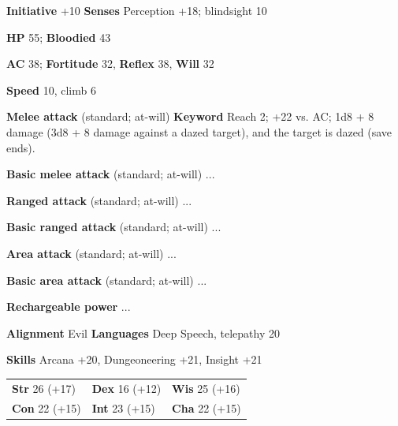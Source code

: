 \begin{monster}{}
	\textbf{Initiative} +10 \qquad \textbf{Senses} Perception +18; blindsight 10 \par
	\textbf{HP} 55; \textbf{Bloodied} 43 \par
	\textbf{AC} 38; \textbf{Fortitude} 32, \textbf{Reﬂex} 38, \textbf{Will} 32 \par
	\textbf{Speed} 10, climb 6 \par
	\begin{monsterskill}{\melee \textbf{Melee attack} (standard; at-will) \diam \textbf{Keyword}}
		Reach 2; +22 vs. AC; 1d8 + 8 damage (3d8 + 8 damage against a dazed target), and the target is dazed (save ends).
	\end{monsterskill}
	\begin{monsterskill}{\meleeBase \textbf{Basic melee attack} (standard; at-will)}
		...
	\end{monsterskill}
	\begin{monsterskill}{\ranged \textbf{Ranged attack} (standard; at-will)}
	...
	\end{monsterskill}
	\begin{monsterskill}{\rangedBase \textbf{Basic ranged attack} (standard; at-will)}
		...
	\end{monsterskill}
	\begin{monsterskill}{\area \textbf{Area attack} (standard; at-will)}
		...
	\end{monsterskill}
	\begin{monsterskill}{\areaBase \textbf{Basic area attack} (standard; at-will)}
		...
	\end{monsterskill}
	\begin{monsterskill}{\textbf{Rechargeable power} \done \dtwo \dthree \dfour \dfive \dsix}
		...
	\end{monsterskill}
	\begin{darkline}
		\textbf{Alignment} Evil \qquad \textbf{Languages} Deep Speech, telepathy 20


		\textbf{Skills} Arcana +20, Dungeoneering +21, Insight +21

		\begin{tabular}{lll}
			\textbf{Str} 26 (+17) &
			\textbf{Dex} 16 (+12) &
			\textbf{Wis} 25 (+16) \\
			\textbf{Con} 22 (+15) &
			\textbf{Int} 23 (+15) &
			\textbf{Cha} 22 (+15)
		\end{tabular}
	\end{darkline}
\end{monster}

